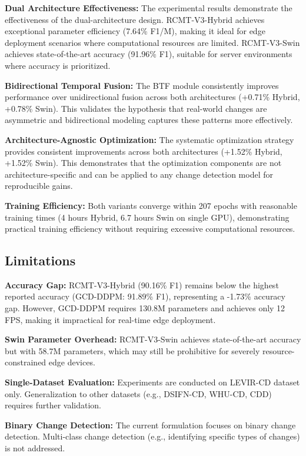 \documentclass[journal]{IEEEtran}
\begin{document}
{\textbf{Dual Architecture Effectiveness:} The experimental results demonstrate the effectiveness of the dual-architecture design. RCMT-V3-Hybrid achieves exceptional parameter efficiency (7.64\% F1/M), making it ideal for edge deployment scenarios where computational resources are limited. RCMT-V3-Swin achieves state-of-the-art accuracy (91.96\% F1), suitable for server environments where accuracy is prioritized.

\textbf{Bidirectional Temporal Fusion:} The BTF module consistently improves performance over unidirectional fusion across both architectures (+0.71\% Hybrid, +0.78\% Swin). This validates the hypothesis that real-world changes are asymmetric and bidirectional modeling captures these patterns more effectively.

\textbf{Architecture-Agnostic Optimization:} The systematic optimization strategy provides consistent improvements across both architectures (+1.52\% Hybrid, +1.52\% Swin). This demonstrates that the optimization components are not architecture-specific and can be applied to any change detection model for reproducible gains.

\textbf{Training Efficiency:} Both variants converge within 207 epochs with reasonable training times (4 hours Hybrid, 6.7 hours Swin on single GPU), demonstrating practical training efficiency without requiring excessive computational resources.

\subsection{Limitations}

\textbf{Accuracy Gap:} RCMT-V3-Hybrid (90.16\% F1) remains below the highest reported accuracy (GCD-DDPM: 91.89\% F1), representing a -1.73\% accuracy gap. However, GCD-DDPM requires 130.8M parameters and achieves only 12 FPS, making it impractical for real-time edge deployment.

\textbf{Swin Parameter Overhead:} RCMT-V3-Swin achieves state-of-the-art accuracy but with 58.7M parameters, which may still be prohibitive for severely resource-constrained edge devices.

\textbf{Single-Dataset Evaluation:} Experiments are conducted on LEVIR-CD dataset only. Generalization to other datasets (e.g., DSIFN-CD, WHU-CD, CDD) requires further validation.

\textbf{Binary Change Detection:} The current formulation focuses on binary change detection. Multi-class change detection (e.g., identifying specific types of changes) is not addressed.

}
\end{document}
